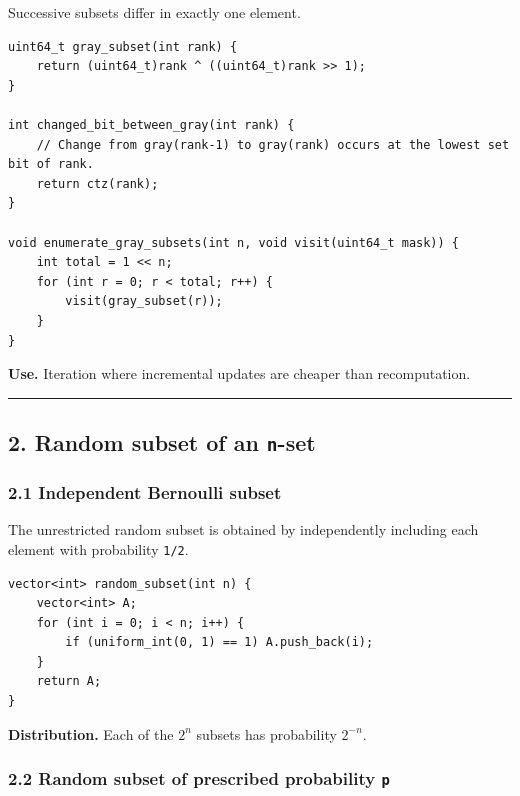 \documentclass[11pt]{article}
\begin{document}
Successive subsets differ in exactly one element.

\begin{verbatim}
uint64_t gray_subset(int rank) {
    return (uint64_t)rank ^ ((uint64_t)rank >> 1);
}

int changed_bit_between_gray(int rank) {
    // Change from gray(rank-1) to gray(rank) occurs at the lowest set bit of rank.
    return ctz(rank);
}

void enumerate_gray_subsets(int n, void visit(uint64_t mask)) {
    int total = 1 << n;
    for (int r = 0; r < total; r++) {
        visit(gray_subset(r));
    }
}
\end{verbatim}

\textbf{Use.} Iteration where incremental updates are cheaper than recomputation.

\begin{center}\rule{0.5\linewidth}{0.5pt}\end{center}

\subsection{\texorpdfstring{2. Random subset of an \texttt{n}-set}{2. Random subset of an n-set}}\label{random-subset-of-an-n-set}

\subsubsection{2.1 Independent Bernoulli subset}\label{independent-bernoulli-subset}

The unrestricted random subset is obtained by independently including each element with probability \texttt{1/2}.

\begin{verbatim}
vector<int> random_subset(int n) {
    vector<int> A;
    for (int i = 0; i < n; i++) {
        if (uniform_int(0, 1) == 1) A.push_back(i);
    }
    return A;
}
\end{verbatim}

\textbf{Distribution.} Each of the \(2^n\) subsets has probability \(2^{-n}\).

\subsubsection{\texorpdfstring{2.2 Random subset of prescribed probability \texttt{p}}{2.2 Random subset of prescribed probability p}}\label{random-subset-of-prescribed-probability-p}
\end{document}
